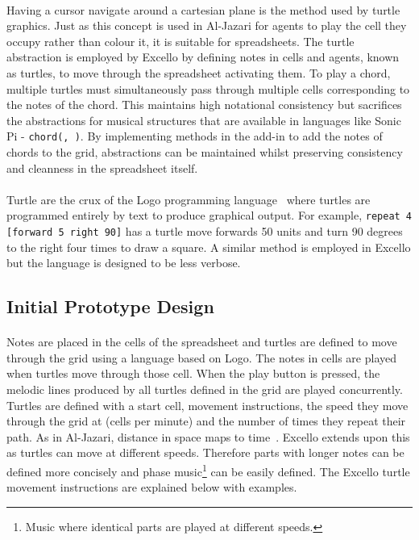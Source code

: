\paragraph{} Having a cursor navigate around a cartesian plane is the method used by turtle graphics. Just as this concept is used in Al-Jazari for agents to play the cell they occupy rather than colour it, it is suitable for spreadsheets. The turtle abstraction is employed by Excello by defining notes in cells and agents, known as turtles, to move through the spreadsheet activating them. To play a chord, multiple turtles must simultaneously pass through multiple cells corresponding to the notes of the chord. This maintains high notational consistency but sacrifices the abstractions for musical structures that are available in languages like Sonic Pi - \texttt{chord(, )}. By implementing methods in the add-in to add the notes of chords to the grid, abstractions can be maintained whilst preserving consistency and cleanness in the spreadsheet itself.

\paragraph{} Turtle are the crux of the Logo programming language~\cite{goldman:turtle} where turtles are programmed entirely by text to produce graphical output. For example, \texttt{repeat 4 [forward 5 right 90]} has a turtle move forwards 50 units and turn 90 degrees to the right four times to draw a square. A similar method is employed in Excello but the language is designed to be less verbose.

\subsection{Initial Prototype Design}

\paragraph{} Notes are placed in the cells of the spreadsheet and turtles are defined to move through the grid using a language based on Logo. The notes in cells are played when turtles move through those cell. When the play button is pressed, the melodic lines produced by all turtles defined in the grid are played concurrently. Turtles are defined with a start cell, movement instructions, the speed they move through the grid at (cells per minute) and the number of times they repeat their path. As in Al-Jazari, distance in space maps to time~\cite{mclean:texture}. Excello extends upon this as turtles can move at different speeds. Therefore parts with longer notes can be defined more concisely and phase music\footnote{Music where identical parts are played at different speeds.} can be easily defined. The Excello turtle movement instructions are explained below with examples.

